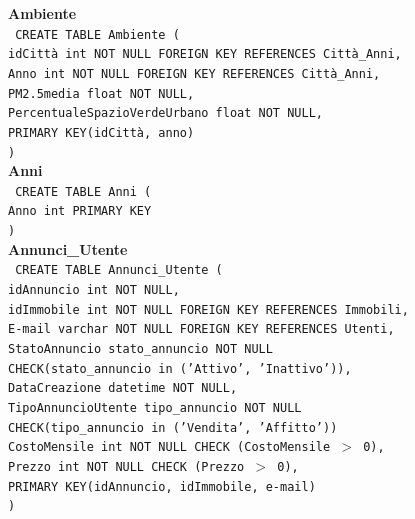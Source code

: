 \documentclass[a4paper,12pt]{report}
\begin{document}
                \noindent
                {\large \textbf{Ambiente}} \\
                \texttt{
                    CREATE TABLE Ambiente ( \\
                    \null\quad\quad idCittà int NOT NULL FOREIGN KEY REFERENCES Città\_Anni, \\
                    \null\quad\quad Anno int NOT NULL FOREIGN KEY REFERENCES Città\_Anni, \\
                    \null\quad\quad PM2.5media                      float           NOT NULL, \\
                    \null\quad\quad PercentualeSpazioVerdeUrbano    float           NOT NULL, \\
                    \null\quad\quad PRIMARY KEY(idCittà, anno) \\
                    )
                } \\

                \noindent
                {\large \textbf{Anni}} \\
                \texttt{
                    CREATE TABLE Anni ( \\
                    \null\quad\quad Anno    int     PRIMARY KEY \\
                    )
                } \\

                \noindent
                {\large \textbf{Annunci\_Utente}} \\
                \texttt{
                    CREATE TABLE Annunci\_Utente ( \\
                    \null\quad\quad idAnnuncio          int             NOT NULL, \\ 
                    \null\quad\quad idImmobile int NOT NULL FOREIGN KEY REFERENCES Immobili, \\
                    \null\quad\quad E-mail varchar NOT NULL FOREIGN KEY REFERENCES Utenti, \\
                    \null\quad\quad StatoAnnuncio       stato\_annuncio         NOT NULL \\
                            \null\qquad\qquad CHECK(stato\_annuncio in ('Attivo', 'Inattivo')), \\
                    \null\quad\quad DataCreazione       datetime        NOT NULL, \\
                    \null\quad\quad TipoAnnuncioUtente  tipo\_annuncio  NOT NULL \\
                            \null\qquad\qquad CHECK(tipo\_annuncio in ('Vendita', 'Affitto')) \\
                    \null\quad\quad CostoMensile        int             NOT NULL CHECK (CostoMensile $>$ 0), \\
                    \null\quad\quad Prezzo              int             NOT NULL CHECK (Prezzo $>$ 0),\\
                    \null\quad\quad PRIMARY KEY(idAnnuncio, idImmobile, e-mail) \\
                    )
                } \\
\end{document}
